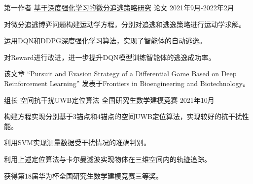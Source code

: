 \begin{cventries}
\cventry
  {第一作者} %
  {\href{https://www.frontiersin.org/articles/10.3389/fbioe.2022.827408/full}{基于深度强化学习的微分追逃策略研究}} %
  {论文} %
  {2021年9月-2022年2月} %
  {
    \begin{cvitems} %
      \item {对微分追逃博弈问题构建运动学方程，分别对追逃和逃逸策略进行运动学求解。}
      \item {运用DQN和DDPG深度强化学习算法，实现了智能体的自动逃逸。}
      \item {对Reward进行改进，进一步提升DQN模型训练智能体的逃逸成功率。}
      \item {该文章 “Pursuit and Evasion Strategy of a Differential Game Based on Deep Reinforcement Learning” 发表于Frontiers in Bioengineering and Biotechnology。}
    \end{cvitems}
  }
  \cventry
    {组长} %
    {空间抗干扰UWB定位算法} %
    {全国研究生数学建模竞赛} %
    {2021年10月} %
    {
      \begin{cvitems} %
        \item {构建方程实现分别基于3锚点和4锚点的空间UWB定位算法，实现较好的抗干扰性能。}
        \item {利用SVM实现测量数据受干扰情况的准确判别。}
        \item {利用上述定位算法与卡尔曼滤波实现物体在三维空间内的轨迹追踪。}
        \item {获得第18届华为杯全国研究生数学建模竞赛三等奖。}
      \end{cvitems}
    }
\end{cventries}
